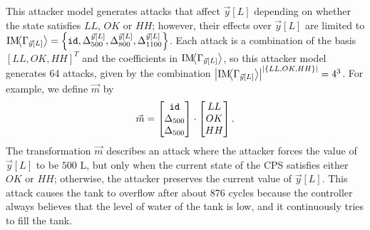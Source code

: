 {\begin{example}
  This attacker model generates attacks that affect $\vec{y}[L]$  depending on whether the state satisfies $LL$, $OK$ or $HH$; 
  however, their effects over $\vec{y}[L]$ are limited to $\text{IM}\!{{\left<\Gamma_{\vec{y}[L]}\right>}}=\left\{{\texttt{id}}, {\Delta}^{\vec{y}[L]}_{500}, {\Delta}^{\vec{y}[L]}_{800}, {\Delta}^{\vec{y}[L]}_{1100}\right\}$. Each attack is a combination of the basis $[LL, OK, HH]^T$ and the coefficients in $\text{IM}\!{{\left<\Gamma_{\vec{y}[L]}\right>}}$, so this attacker model generates 64 attacks, given by the combination ${\left|\text{IM}\!{{\left<\Gamma_{\vec{y}[L]}\right>}}\right|}^{\left|\left\{LL,OK,HH\right\}\right|}=4^3$. For example, we define $\vec{m}$ by
\begin{align}
  \vec{m}=
  \begin{bmatrix}
    {\texttt{id}} \\
    {\Delta}_{500} \\
    {\Delta}_{500}
  \end{bmatrix}
  \cdot
  \begin{bmatrix}
    LL \\
    OK\\
    HH
  \end{bmatrix}.
\end{align}
The transformation $\vec{m}$ describes an attack where the attacker forces the value of $\vec{y}[L]$ to be $500$ L, but only when the current state of the CPS satisfies either $OK$ or $HH$; otherwise, the attacker preserves the current value of $\vec{y}[L]$. This attack causes the tank to overflow after about 876 cycles because the controller always believes that the level of water of the tank is low, and it continuously tries to fill the tank.
\end{example}
}
